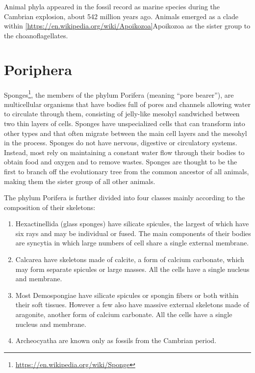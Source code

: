 \documentclass[]{book}
\providecommand{\tightlist}{%
  \setlength{\itemsep}{0pt}\setlength{\parskip}{0pt}}
\let\rmarkdownfootnote\footnote%
\def\footnote{\protect\rmarkdownfootnote}
\renewcommand{\href}[2]{#2\footnote{\url{#1}}}
\theoremstyle{definition}
\theoremstyle{definition}
\theoremstyle{definition}
\theoremstyle{remark}
\begin{document}
Animal phyla appeared in the fossil record as marine species during the
Cambrian explosion, about 542 million years ago. Animals emerged as a
clade within \ref{https://en.wikipedia.org/wiki/Apoikozoa}{Apoikozoa} as the sister group to the choanoflagellates.

\section{Poriphera}\label{poriphera}

\href{https://en.wikipedia.org/wiki/Sponge}{Sponges}, the members of the
phylum Porifera (meaning ``pore bearer''), are multicellular organisms
that have bodies full of pores and channels allowing water to circulate
through them, consisting of jelly-like mesohyl sandwiched between two
thin layers of cells. Sponges have unspecialized cells that can
transform into other types and that often migrate between the main cell
layers and the mesohyl in the process. Sponges do not have nervous,
digestive or circulatory systems. Instead, most rely on maintaining a
constant water flow through their bodies to obtain food and oxygen and
to remove wastes. Sponges are thought to be the first to branch off the
evolutionary tree from the common ancestor of all animals, making them
the sister group of all other animals.

The phylum Porifera is further divided into four classes mainly
according to the composition of their skeletons:

\begin{enumerate}
\def\labelenumi{\arabic{enumi}.}
\tightlist
\item
  Hexactinellida (glass sponges) have silicate spicules, the largest of
  which have six rays and may be individual or fused. The main
  components of their bodies are syncytia in which large numbers of cell
  share a single external membrane.
\item
  Calcarea have skeletons made of calcite, a form of calcium carbonate,
  which may form separate spicules or large masses. All the cells have a
  single nucleus and membrane.
\item
  Most Demospongiae have silicate spicules or spongin fibers or both
  within their soft tissues. However a few also have massive external
  skeletons made of aragonite, another form of calcium carbonate. All
  the cells have a single nucleus and membrane.
\item
  Archeocyatha are known only as fossils from the Cambrian period.
\end{enumerate}
\end{document}
